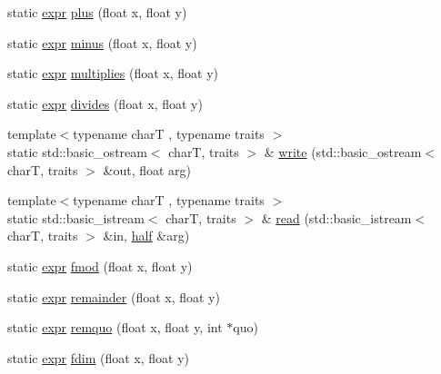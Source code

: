 \begin{DoxyCompactItemize}
\item 
static \hyperlink{structhalf__float_1_1detail_1_1expr}{expr} \hyperlink{structhalf__float_1_1detail_1_1functions_a00e552f89df586b355b7aaa3668bdfa1}{plus} (float x, float y)
\item 
static \hyperlink{structhalf__float_1_1detail_1_1expr}{expr} \hyperlink{structhalf__float_1_1detail_1_1functions_ad2d876e13910f4e95ea64161dc69d581}{minus} (float x, float y)
\item 
static \hyperlink{structhalf__float_1_1detail_1_1expr}{expr} \hyperlink{structhalf__float_1_1detail_1_1functions_a3d2a59f7891825142a62f7663bdefd73}{multiplies} (float x, float y)
\item 
static \hyperlink{structhalf__float_1_1detail_1_1expr}{expr} \hyperlink{structhalf__float_1_1detail_1_1functions_ac9dfde49f70098d39e83d1123574c60a}{divides} (float x, float y)
\item 
{\footnotesize template$<$typename charT , typename traits $>$ }\\static std\+::basic\+\_\+ostream$<$ charT, traits $>$ \& \hyperlink{structhalf__float_1_1detail_1_1functions_a240e518b170e2c43df73fe28c3be7ed3}{write} (std\+::basic\+\_\+ostream$<$ charT, traits $>$ \&out, float arg)
\item 
{\footnotesize template$<$typename charT , typename traits $>$ }\\static std\+::basic\+\_\+istream$<$ charT, traits $>$ \& \hyperlink{structhalf__float_1_1detail_1_1functions_a11c9c85a160dab9b3569d1e051bf6ba5}{read} (std\+::basic\+\_\+istream$<$ charT, traits $>$ \&in, \hyperlink{classhalf__float_1_1half}{half} \&arg)
\item 
static \hyperlink{structhalf__float_1_1detail_1_1expr}{expr} \hyperlink{structhalf__float_1_1detail_1_1functions_ab738d01b18f68f9a1472490d1f20ffd0}{fmod} (float x, float y)
\item 
static \hyperlink{structhalf__float_1_1detail_1_1expr}{expr} \hyperlink{structhalf__float_1_1detail_1_1functions_ae50ef512e0b117a0de654f54f31c6862}{remainder} (float x, float y)
\item 
static \hyperlink{structhalf__float_1_1detail_1_1expr}{expr} \hyperlink{structhalf__float_1_1detail_1_1functions_a9d78bde132fdf1cddf832f17cf86ffec}{remquo} (float x, float y, int $\ast$quo)
\item 
static \hyperlink{structhalf__float_1_1detail_1_1expr}{expr} \hyperlink{structhalf__float_1_1detail_1_1functions_a9850489a627096344f41d3e18976eaff}{fdim} (float x, float y)

\end{DoxyCompactItemize}
